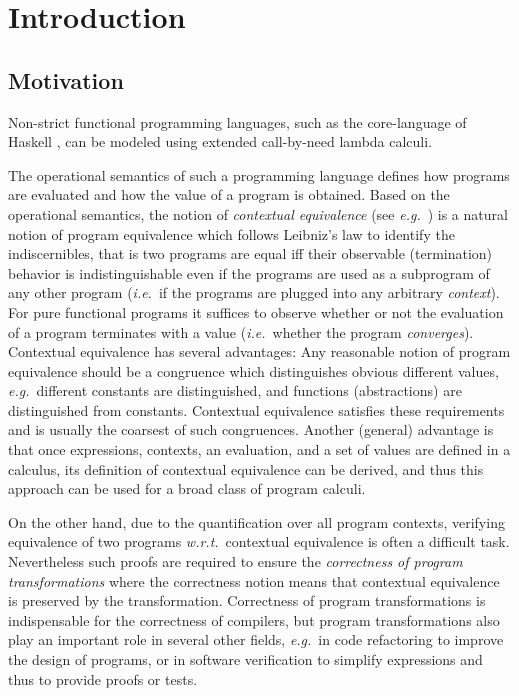\documentclass{LMCS}
\theoremstyle{plain}
\theoremstyle{definition}
\newcommand{\eg}{{\em e.g.}}
\newcommand{\ie}{{\em i.e.}}
\newcommand{\wrt}{{\em w.r.t.}}
\begin{document}
\section{Introduction}
\subsection*{Motivation}
Non-strict functional programming languages, such as the core-language of 
Haskell \cite{peyton-jones-haskell-98:03}, can be modeled using extended 
call-by-need lambda calculi. 

The operational semantics of such a programming language defines how programs
are evaluated and how the value of a program is obtained. 
Based on the operational semantics, the notion of {\em contextual equivalence} 
(see \eg\ \cite{morris:68,plotkin:75}) is a natural notion of program 
equivalence which follows Leibniz's law to identify the indiscernibles, that is
two programs are equal iff their observable (termination) behavior is 
indistinguishable even if the programs are used as a subprogram of any other 
program (\ie\ if the programs are plugged into any arbitrary {\em context}). 
For pure functional programs it suffices to observe whether or not the 
evaluation of a program terminates with a value (\ie\ whether the program
{\em converges}). 
Contextual equivalence has several advantages: 
Any reasonable notion of program equivalence should be a congruence which
distinguishes obvious different values, \eg\ different constants are 
distinguished, and functions (abstractions) are distinguished from constants. 
Contextual equivalence satisfies these requirements and is usually the 
coarsest of such congruences. 
Another (general) advantage is that once expressions, contexts, an evaluation,
and a set of values are defined in a calculus, its definition of contextual 
equivalence can be derived, and thus this approach can be used for a broad 
class of program calculi.
 
On the other hand, due to the quantification over all program contexts, 
verifying equivalence of two programs \wrt\ contextual equivalence is often a
difficult task.
Nevertheless such proofs are required to ensure the 
{\em correctness of program transformations} where the correctness notion 
means that contextual equivalence is preserved by the transformation.
Correctness of program transformations is indispensable for the correctness of 
compilers, but program transformations also play an important role in several 
other fields, \eg\ in code refactoring to improve the design of programs, or in
software verification to simplify expressions and thus to provide proofs 
or tests.
\end{document}
